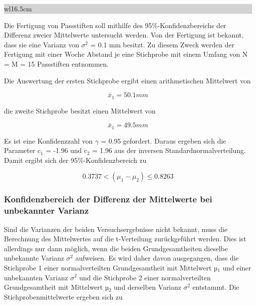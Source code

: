 \clearpage 

\noindent
\colorbox{lightgray}{%
%
\renewcommand\arraystretch{0.6}%
\begin{tabular}{ wl{16.5cm} }
{\selectfont
{}}
\end{tabular}%
}\bigskip

\noindent Die Fertigung von Passstiften soll mithilfe des 95\%-Konfidenzbereichs der Differenz zweier Mittelwerte untersucht werden. Von der Fertigung ist bekannt, dass sie eine Varianz von $\sigma^{2}$ = 0.1 mm besitzt. Zu diesem Zweck werden der Fertigung mit einer Woche Abstand je eine Stichprobe mit einem Umfang von N = M = 15 Passstiften entnommen.\newline

\noindent Die Auswertung der ersten Stichprobe ergibt einen arithmetischen Mittelwert von

\begin{equation}\label{eq:fiveseventytwo}
\bar{x}_{1} =50.1 mm
\end{equation}

\noindent die zweite Stichprobe besitzt einen Mittelwert von

\begin{equation}\label{eq:fiveseventythree}
\bar{x}_{1} =49.5 mm
\end{equation}

\noindent Es ist eine Konfidenzzahl von $\gamma$ = 0.95 gefordert. Daraus ergeben sich die Parameter c$_{1}$ = -1.96 und c$_{2}$ = 1.96 aus der inversen Standardnormalverteilung. Damit ergibt sich der 95\%-Konfidenzbereich zu

\begin{equation}\label{eq:fiveseventyfour}
0.3737 <\left(\mu _{1} -\mu _{2} \right)\le 0.8263
\end{equation}

\subsubsection{Konfidenzbereich der Differenz der Mittelwerte bei unbekannter Varianz}

\noindent Sind die Varianzen der beiden Versuchsergebnisse nicht bekannt, muss die Berechnung des Mittelwertes auf die t-Verteilung zur\"{u}ckgef\"{u}hrt werden. Dies ist allerdings nur dann m\"{o}glich, wenn die beiden Grundgesamtheiten dieselbe unbekannte Varianz $\sigma^{2}$ aufweisen. Es wird daher davon ausgegangen, dass die Stichprobe 1 einer normalverteilten Grundgesamtheit mit Mittelwert µ$_{1}$ und einer unbekannten Varianz $\sigma^{2}$ und die Stichprobe 2 einer normalverteilten Grundgesamtheit mit Mittelwert µ$_{2}$ und derselben Varianz $\sigma^{2}$ entstammt. Die Stichprobenmittelwerte ergeben sich zu

